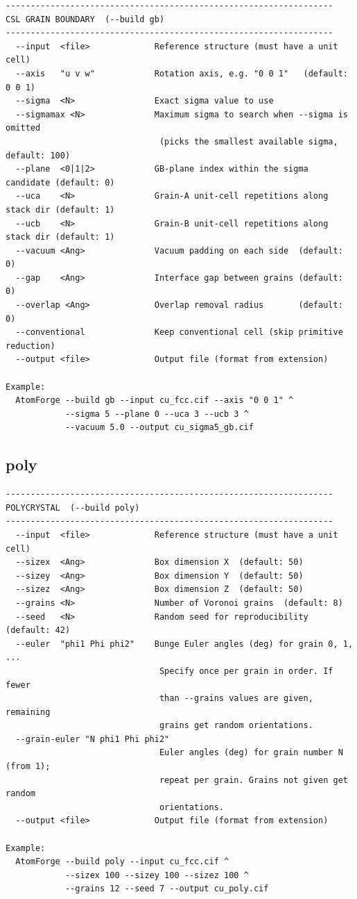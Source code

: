 \begin{lstlisting}
------------------------------------------------------------------
CSL GRAIN BOUNDARY  (--build gb)
------------------------------------------------------------------
  --input  <file>             Reference structure (must have a unit cell)
  --axis   "u v w"            Rotation axis, e.g. "0 0 1"   (default: 0 0 1)
  --sigma  <N>                Exact sigma value to use
  --sigmamax <N>              Maximum sigma to search when --sigma is omitted
                               (picks the smallest available sigma, default: 100)
  --plane  <0|1|2>            GB-plane index within the sigma candidate (default: 0)
  --uca    <N>                Grain-A unit-cell repetitions along stack dir (default: 1)
  --ucb    <N>                Grain-B unit-cell repetitions along stack dir (default: 1)
  --vacuum <Ang>              Vacuum padding on each side  (default: 0)
  --gap    <Ang>              Interface gap between grains (default: 0)
  --overlap <Ang>             Overlap removal radius       (default: 0)
  --conventional              Keep conventional cell (skip primitive reduction)
  --output <file>             Output file (format from extension)

Example:
  AtomForge --build gb --input cu_fcc.cif --axis "0 0 1" ^
            --sigma 5 --plane 0 --uca 3 --ucb 3 ^
            --vacuum 5.0 --output cu_sigma5_gb.cif
\end{lstlisting}

\clearpage

\subsection{poly}

\begin{lstlisting}
------------------------------------------------------------------
POLYCRYSTAL  (--build poly)
------------------------------------------------------------------
  --input  <file>             Reference structure (must have a unit cell)
  --sizex  <Ang>              Box dimension X  (default: 50)
  --sizey  <Ang>              Box dimension Y  (default: 50)
  --sizez  <Ang>              Box dimension Z  (default: 50)
  --grains <N>                Number of Voronoi grains  (default: 8)
  --seed   <N>                Random seed for reproducibility  (default: 42)
  --euler  "phi1 Phi phi2"    Bunge Euler angles (deg) for grain 0, 1, ...
                               Specify once per grain in order. If fewer
                               than --grains values are given, remaining
                               grains get random orientations.
  --grain-euler "N phi1 Phi phi2"
                               Euler angles (deg) for grain number N (from 1);
                               repeat per grain. Grains not given get random
                               orientations.
  --output <file>             Output file (format from extension)

Example:
  AtomForge --build poly --input cu_fcc.cif ^
            --sizex 100 --sizey 100 --sizez 100 ^
            --grains 12 --seed 7 --output cu_poly.cif
\end{lstlisting}

